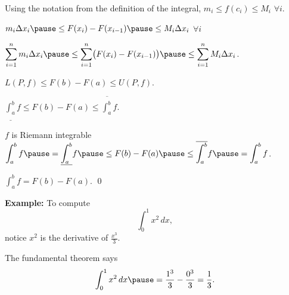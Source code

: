 \documentclass[10pt,aspectratio=169]{beamer}
\begin{document}
\begin{frame}
Using the notation from the definition of the integral, \quad
$m_i \leq f(c_i) \leq M_i$ \quad $\forall i$.

\pause
\medskip

\thus \quad
$m_i \Delta x_i
\pause
\leq F(x_i) - F(x_{i-1})
\pause
\leq M_i \Delta x_i$
\quad
$\forall i$

\pause
\medskip

\thus \quad
$\displaystyle
\sum_{i=1}^n m_i \Delta x_i
\pause
\leq \sum_{i=1}^n \bigl(F(x_i) - F(x_{i-1}) \bigr)
\pause
\leq \sum_{i=1}^n M_i \Delta x_i$.

\pause
\medskip

\thus \quad
$\displaystyle
L(P,f) \leq F(b)-F(a) \leq U(P,f)$.

\pause
\medskip

\thus \quad
$\displaystyle
\underline{\int_a^b} f
\leq
F(b)-F(a)
\leq
\overline{\int_a^b} f$.

\pause
\medskip

$f$ is Riemann integrable
\pause
\wthus 
$\displaystyle \int_a^b f
\pause
=
\underline{\int_a^b} f
\pause
\leq
F(b)-F(a)
\pause
\leq
\overline{\int_a^b} f
\pause
=
\int_a^b f$.

\pause
\medskip

\thus  \quad
$\displaystyle \int_a^b f = F(b)-F(a)$.
\qed

\end{frame}

\begin{frame}

\textbf{Example:}
To compute
\begin{equation*}
\int_0^1 x^2 \,dx ,
\end{equation*}
\pause
notice $x^2$ is the derivative of $\frac{x^3}{3}$.

\pause
The fundamental theorem says
\begin{equation*}
\int_0^1 x^2 \,dx
\pause
=
\frac{1^3}{3}
-
\frac{0^3}{3}
= \frac{1}{3}.
\end{equation*}

\end{frame}
\end{document}
